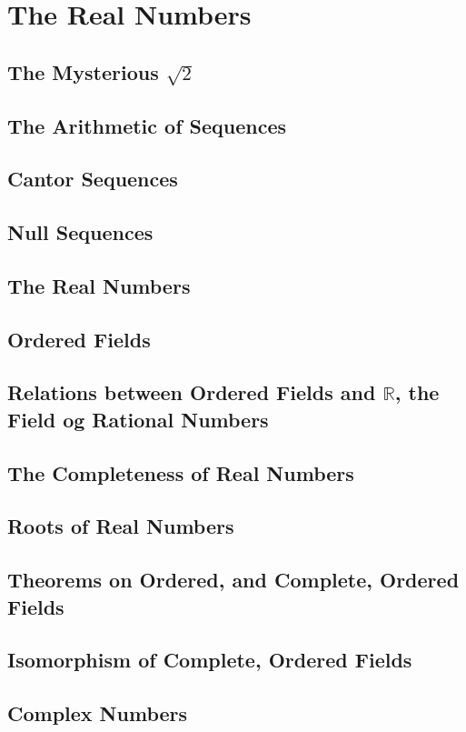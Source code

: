 \documentclass{book}
\theoremstyle{definition}
\theoremstyle{remark}
\newcommand{\bb}[1]{\mathbb{#1}}
\begin{document}
\newpage
\section{The Real Numbers}

\subsection{The Mysterious $\sqrt{2}$}
\subsection{The Arithmetic of Sequences}
\subsection{Cantor Sequences}
\subsection{Null Sequences}
\subsection{The Real Numbers}
\subsection{Ordered Fields}
\subsection{Relations between Ordered Fields and $\bb{R}$, the Field og Rational Numbers}
\subsection{The Completeness of Real Numbers}
\subsection{Roots of Real Numbers}
\subsection{Theorems on Ordered, and Complete, Ordered Fields}
\subsection{Isomorphism of Complete, Ordered Fields}
\subsection{Complex Numbers}
\end{document}
